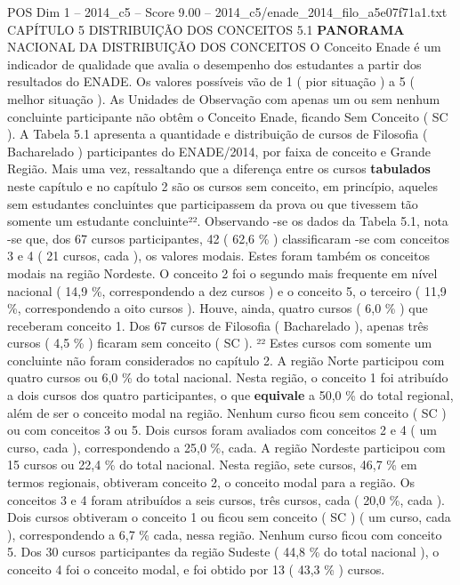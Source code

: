 \begin{textsample}{POS Dim 1 – 2014\_c5 – Score 9.00 – 2014\_c5/enade\_2014\_filo\_a5e07f71a1.txt}  \label{ex:f1_pos_106}
CAPÍTULO 5 DISTRIBUIÇÃO DOS CONCEITOS 5.1 \textbf{PANORAMA} NACIONAL DA DISTRIBUIÇÃO DOS CONCEITOS O Conceito Enade é um indicador de qualidade que avalia o desempenho dos estudantes a partir dos resultados do ENADE.
Os valores possíveis vão de 1 ( pior situação ) a 5 ( melhor situação ).
As Unidades de Observação com apenas um ou sem nenhum concluinte participante não obtêm o Conceito Enade, ficando Sem Conceito ( SC ).
A Tabela 5.1 apresenta a quantidade e distribuição de cursos de Filosofia ( Bacharelado ) participantes do ENADE/2014, por faixa de conceito e Grande Região.
Mais uma vez, ressaltando que a diferença entre os cursos \textbf{tabulados} neste capítulo e no capítulo 2 são os cursos sem conceito, em princípio, aqueles sem estudantes concluintes que participassem da prova ou que tivessem tão somente um estudante concluinte²².
Observando -se os dados da Tabela 5.1, nota -se que, dos 67 cursos participantes, 42 ( 62,6 \% ) classificaram -se com conceitos 3 e 4 ( 21 cursos, cada ), os valores modais.
Estes foram também os conceitos modais na região Nordeste.
O conceito 2 foi o segundo mais frequente em nível nacional ( 14,9 \%, correspondendo a dez cursos ) e o conceito 5, o terceiro ( 11,9 \%, correspondendo a oito cursos ).
Houve, ainda, quatro cursos ( 6,0 \% ) que receberam conceito 1.
Dos 67 cursos de Filosofia ( Bacharelado ), apenas três cursos ( 4,5 \% ) ficaram sem conceito ( SC ). ²² Estes cursos com somente um concluinte não foram considerados no capítulo 2.
A região Norte participou com quatro cursos ou 6,0 \% do total nacional.
Nesta região, o conceito 1 foi atribuído a dois cursos dos quatro participantes, o que \textbf{equivale} a 50,0 \% do total regional, além de ser o conceito modal na região.
Nenhum curso ficou sem conceito ( SC ) ou com conceitos 3 ou 5.
Dois cursos foram avaliados com conceitos 2 e 4 ( um curso, cada ), correspondendo a 25,0 \%, cada.
A região Nordeste participou com 15 cursos ou 22,4 \% do total nacional.
Nesta região, sete cursos, 46,7 \% em termos regionais, obtiveram conceito 2, o conceito modal para a região.
Os conceitos 3 e 4 foram atribuídos a seis cursos, três cursos, cada ( 20,0 \%, cada ).
Dois cursos obtiveram o conceito 1 ou ficou sem conceito ( SC ) ( um curso, cada ), correspondendo a 6,7 \% cada, nessa região.
Nenhum curso ficou com conceito 5.
Dos 30 cursos participantes da região Sudeste ( 44,8 \% do total nacional ), o conceito 4 foi o conceito modal, e foi obtido por 13 ( 43,3 \% ) cursos.

\end{textsample}
